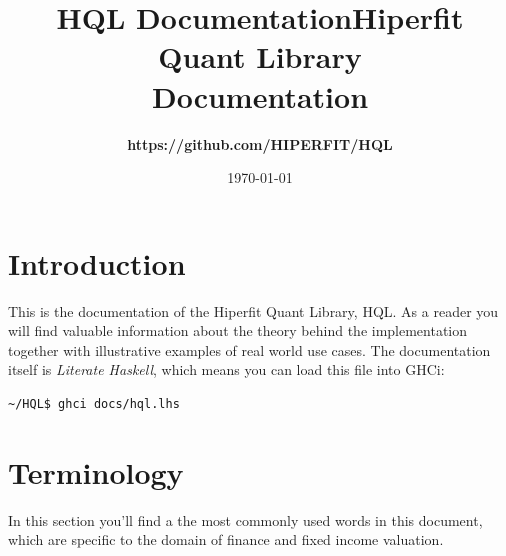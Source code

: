 \documentclass[11pt,a4paper]{article}
\def\Author{
\bf https://github.com/HIPERFIT/HQL
}
\def\Title{\bf Hiperfit Quant Library \\ Documentation}
\numberwithin{equation}{section}
\begin{document}
\title{HQL Documentation}

\title{\Title}
\author{\Author}
\date{\today}
\maketitle

\tableofcontents

\FrameSep

\newpage

\section{Introduction}
This is the documentation of the Hiperfit Quant Library, HQL. As a reader you will
find valuable information about the theory behind the implementation together with
illustrative examples of real world use cases. The documentation itself is \textit{Literate Haskell}\cite{LitHaskell},
which means you can load this file into GHCi:

\FrameSep
\begin{lstlisting}
~/HQL$ ghci docs/hql.lhs
\end{lstlisting}

\section{Terminology}
In this section you'll find a the most commonly used words in this document, which are specific to the domain of finance and fixed income valuation.

\end{document}
